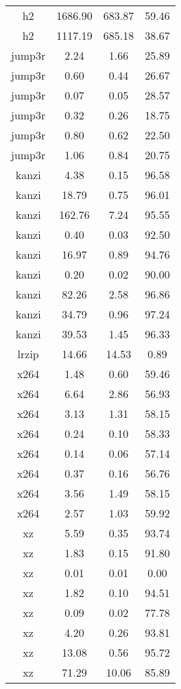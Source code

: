 \begin{table}[h]
\begin{tabular}{|c|c|c|c|}
        h2 & 1686.90 & 683.87 & 59.46 \\
        h2 & 1117.19 & 685.18 & 38.67 \\
        jump3r & 2.24 & 1.66 & 25.89 \\
        jump3r & 0.60 & 0.44 & 26.67 \\
        jump3r & 0.07 & 0.05 & 28.57 \\
        jump3r & 0.32 & 0.26 & 18.75 \\
        jump3r & 0.80 & 0.62 & 22.50 \\
        jump3r & 1.06 & 0.84 & 20.75 \\
        kanzi & 4.38 & 0.15 & 96.58 \\
        kanzi & 18.79 & 0.75 & 96.01 \\
        kanzi & 162.76 & 7.24 & 95.55 \\
        kanzi & 0.40 & 0.03 & 92.50 \\
        kanzi & 16.97 & 0.89 & 94.76 \\
        kanzi & 0.20 & 0.02 & 90.00 \\
        kanzi & 82.26 & 2.58 & 96.86 \\
        kanzi & 34.79 & 0.96 & 97.24 \\
        kanzi & 39.53 & 1.45 & 96.33 \\
        lrzip & 14.66 & 14.53 & 0.89 \\
        x264 & 1.48 & 0.60 & 59.46 \\
        x264 & 6.64 & 2.86 & 56.93 \\
        x264 & 3.13 & 1.31 & 58.15 \\
        x264 & 0.24 & 0.10 & 58.33 \\
        x264 & 0.14 & 0.06 & 57.14 \\
        x264 & 0.37 & 0.16 & 56.76 \\
        x264 & 3.56 & 1.49 & 58.15 \\
        x264 & 2.57 & 1.03 & 59.92 \\
        xz & 5.59 & 0.35 & 93.74 \\
        xz & 1.83 & 0.15 & 91.80 \\
        xz & 0.01 & 0.01 & 0.00 \\
        xz & 1.82 & 0.10 & 94.51 \\
        xz & 0.09 & 0.02 & 77.78 \\
        xz & 4.20 & 0.26 & 93.81 \\
        xz & 13.08 & 0.56 & 95.72 \\
        xz & 71.29 & 10.06 & 85.89 \\

\end{tabular}
\end{table}
